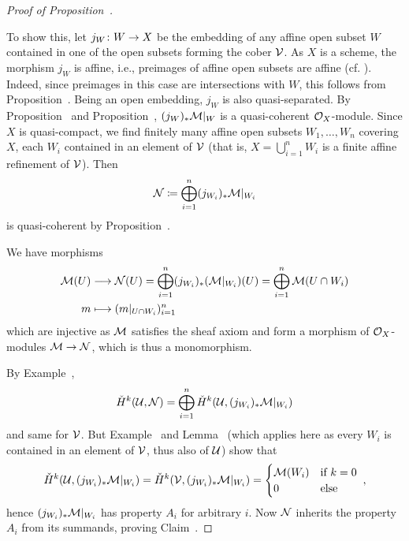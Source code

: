 \documentclass[a4paper,parskip=half,numbers=enddot, DIV=12]{scrreprt}
\begin{document}
\begin{proof}[Proof of Proposition~]
\begin{claim}
	\end{claim}
	To show this, let $j_W\colon W\morphism X$ be the embedding of any affine open subset $W$ contained in one of the open subsets forming the cober $\mathcal{V}$. As $X$ is a scheme, the morphism $j_W$ is affine, i.e., preimages of affine open subsets are affine (cf. \cite[Definition~2.5.1]{alggeo1}). Indeed, since preimages in this case are intersections with $W$, this follows from Proposition~. Being an open embedding, $j_W$ is also quasi-separated. By Proposition~ and Proposition~, $(j_W)_*\mathcal{M}|_W$ is a quasi-coherent $\mathcal{O}_X$-module. Since $X$ is quasi-compact, we find finitely many affine open subsets $W_1,\ldots,W_n$ covering $X$, each $W_i$ contained in an element of $\mathcal{V}$ (that is, $X=\bigcup_{i=1}^nW_i$ is a finite affine refinement of $\mathcal{V}$). Then
	\begin{align*}
		\mathcal{N}\coloneqq\bigoplus_{i=1}^n(j_{W_i})_*\mathcal{M}|_{W_i}
	\end{align*}
	is quasi-coherent by Proposition~.
	
	We have morphisms
	\begin{align*}
		\Mm(U)&\morphism\Nn(U)=\bigoplus_{i=1}^n(j_{W_i})_*(\Mm|_{W_i})(U)=\bigoplus_{i=1}^n\Mm(U\cap W_i)\\
	m&\longmapsto (m|_{U\cap W_i})_{i=1}^n
	\end{align*}
	which are injective as $\mathcal{M}$ satisfies the sheaf axiom and form a morphism of $\mathcal{O}_X$-modules $\Mm\morphism\Nn$, which is thus a monomorphism.
	
	By Example~, 
	\begin{align*}
		\check{H}^k(\mathcal{U},\mathcal{N})=\bigoplus_{i=1}^n\check{H}^k(\mathcal{U},(j_{W_i})_*\mathcal{M}|_{W_i})
	\end{align*}
	and same for $\mathcal{V}$. But Example~ and  Lemma~ (which applies here as every $W_i$ is contained in an element of $\mathcal{V}$, thus also of $\mathcal{U}$) show that 
	\begin{align*}
		\check{H}^k(\mathcal{U},(j_{W_i})_*\mathcal{M}|_{W_i})=\check{H}^k(\mathcal{V},(j_{W_i})_*\mathcal{M}|_{W_i})=\begin{cases}
			\mathcal{M}(W_i) &\text{if }k=0\\
			0 & \text{else}
		\end{cases}\;,
	\end{align*}
	hence $(j_{W_i})_*\mathcal{M}|_{W_i}$ has property $A_i$ for arbitrary $i$. Now $\mathcal{N}$ inherits the property $A_i$ from its summands, proving Claim~.
		

\end{proof}
\end{document}
